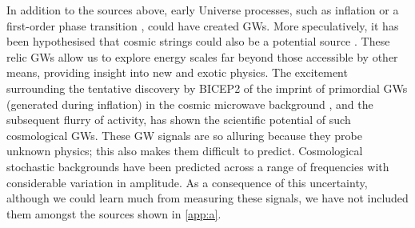 In addition to the sources above, early Universe processes, such as inflation \citep{Grishchuk2005} or a first-order phase transition \citep{Binetruy2012}, could have created GWs. More speculatively, it has been hypothesised that cosmic strings could also be a potential source \citep{Damour2005,Binetruy2012,Aasi2014}. These relic GWs allow us to explore energy scales far beyond those accessible by other means, providing insight into new and exotic physics. The excitement surrounding the tentative discovery by BICEP2 of the imprint of primordial GWs (generated during inflation) in the cosmic microwave background \citep{Ade2014}, and the subsequent flurry of activity, has shown the scientific potential of such cosmological GWs. These GW signals are so alluring because they probe unknown physics; this also makes them difficult to predict. Cosmological stochastic backgrounds have been predicted across a range of frequencies with considerable variation in amplitude. As a consequence of this uncertainty, although we could learn much from measuring these signals, we have not included them amongst the sources shown in \ref{app:a}.


